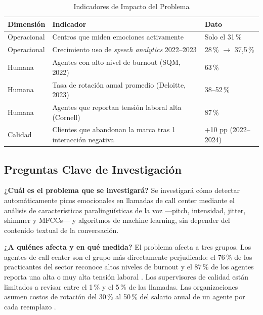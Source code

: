 \begin{table}[!t]
\renewcommand{\arraystretch}{1.3}
\caption{Indicadores de Impacto del Problema}
\label{tab:impacto}
\centering
\begin{tabular}{l p{3.5cm} p{2cm}}
\toprule
\textbf{Dimensión} & \textbf{Indicador} & \textbf{Dato} \\
\midrule
Operacional & Centros que miden emociones activamente                   & Solo el 31\,\% \cite{zoom2025} \\
Operacional & Crecimiento uso de \textit{speech analytics} 2022--2023  & 28\,\% $\to$ 37{,}5\,\% \cite{zoom2025} \\
Humana      & Agentes con alto nivel de burnout (SQM, 2022)            & 63\,\% \cite{sqm2023} \\
Humana      & Tasa de rotación anual promedio (Deloitte, 2023)         & 38--52\,\% \cite{hiringbranch2024} \\
Humana      & Agentes que reportan tensión laboral alta (Cornell)      & 87\,\% \cite{hiringbranch2024} \\
Calidad     & Clientes que abandonan la marca tras 1 interacción negativa & +10 pp (2022--2024) \cite{zoom2025} \\
\bottomrule
\end{tabular}
\end{table}

\subsection{Preguntas Clave de Investigación}

\textbf{¿Cuál es el problema que se investigará?} Se investigará cómo detectar
automáticamente picos emocionales en llamadas de call center mediante el análisis de
características paralingüísticas de la voz —pitch, intensidad, jitter, shimmer y
MFCCs— y algoritmos de machine learning, sin depender del contenido textual de la
conversación.

\textbf{¿A quiénes afecta y en qué medida?} El problema afecta a tres grupos. Los
agentes de call center son el grupo más directamente perjudicado: el 76\,\% de los
practicantes del sector reconoce altos niveles de burnout \cite{sqm2023} y el 87\,\%
de los agentes reporta una alta o muy alta tensión laboral \cite{hiringbranch2024}.
Los supervisores de calidad están limitados a revisar entre el 1\,\% y el 5\,\% de
las llamadas. Las organizaciones asumen costos de rotación del 30\,\% al 50\,\% del
salario anual de un agente por cada reemplazo \cite{sqm2023}.

